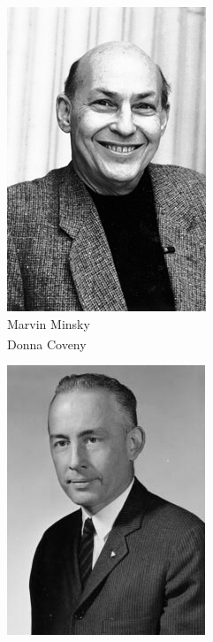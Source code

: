 \begin{frame}[t]
{\begin{minipage}[t]{\textwidth}
		\begin{minipage}[t]{0.24\textwidth}
			\centering
			\begin{figure}[ht]
				\includegraphics[width=.6\textwidth]{img/Marvin-Misky.png}
				{\tiny\\Marvin Minsky\\\textsuperscript{\textcopyright}Donna Coveny}
			\end{figure}
		\end{minipage}
		\begin{minipage}[t]{0.24\textwidth}
			\centering
			\begin{figure}[ht]
				\includegraphics[width=.68\textwidth]{img/Nathaniel-Rochester.jpeg}

\end{figure}
\end{minipage}
\end{minipage}}
\end{frame}
